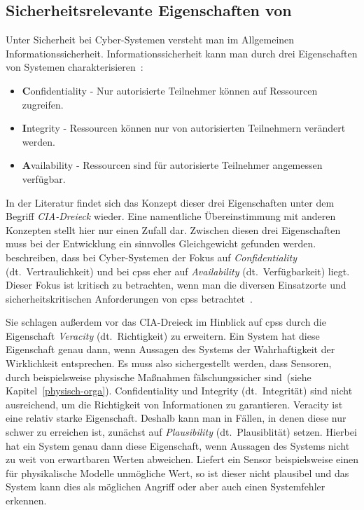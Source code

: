 \documentclass[final,bibliography=totocnumbered]{include/sikseminar}
\newcommand{\fb}[1]{\dofb#1}
\newcommand{\cps}{\glspl{cps}\xspace}
\newcommand{\dofb}[1]{\textbf{#1}\nobreak\hspace{0pt}}
\begin{document}
    \subsection{Sicherheitsrelevante Eigenschaften von }
    \label{subsec:definition}
    Unter Sicherheit bei Cyber-Systemen versteht man im Allgemeinen Informationssicherheit.
    Informationssicherheit kann man durch drei Eigenschaften von Systemen charakterisieren~\cite{CH13}:
    \begin{itemize}[noitemsep,wide=0pt]
        \item \fb{Confidentiality} - Nur autorisierte Teilnehmer können auf Ressourcen zugreifen.
        \item \fb{Integrity} - Ressourcen können nur von autorisierten Teilnehmern verändert werden.
        \item \fb{Availability} - Ressourcen sind für autorisierte Teilnehmer angemessen verfügbar.
    \end{itemize}

    In der Literatur findet sich das Konzept dieser drei Eigenschaften unter dem Begriff \textit{CIA-Dreieck} wieder.
    Eine namentliche Übereinstimmung mit anderen Konzepten stellt hier nur einen Zufall dar.
    Zwischen diesen drei Eigenschaften muss bei der Entwicklung ein sinnvolles Gleichgewicht gefunden werden.
    \citeauthor{GK16}~\cite{GK16} beschreiben, dass bei Cyber-Systemen der Fokus auf \textit{Confidentiality} (dt.\ Vertraulichkeit) und bei \cps eher auf \textit{Availability} (dt.\ Verfügbarkeit) liegt.
    Dieser Fokus ist kritisch zu betrachten, wenn man die diversen Einsatzorte und sicherheitskritischen Anforderungen von \cps betrachtet~\cite{GK16}.

    Sie schlagen außerdem vor das CIA-Dreieck im Hinblick auf \cps durch die Eigenschaft \textit{Veracity} (dt.~Richtigkeit) zu erweitern.
    Ein System hat diese Eigenschaft genau dann, wenn Aussagen des Systems der Wahrhaftigkeit der Wirklichkeit entsprechen.
    Es muss also sichergestellt werden, dass Sensoren, durch beispielsweise physische Maßnahmen fälschungssicher sind~(siehe Kapitel~\ref{physisch-orga}).
    Confidentiality und Integrity (dt.\ Integrität) sind nicht ausreichend, um die Richtigkeit von Informationen zu garantieren.
    Veracity ist eine relativ starke Eigenschaft.
    Deshalb kann man in Fällen, in denen diese nur schwer zu erreichen ist, zunächst auf \textit{Plausibility} (dt.\ Plausiblität) setzen.
    Hierbei hat ein System genau dann diese Eigenschaft, wenn Aussagen des Systems nicht zu weit von erwartbaren Werten abweichen.
    Liefert ein Sensor beispielsweise einen für physikalische Modelle unmögliche Wert, so ist dieser nicht plausibel und das System kann dies als möglichen Angriff oder aber auch einen Systemfehler erkennen.~\cite{GK16,KLG15}
\end{document}
